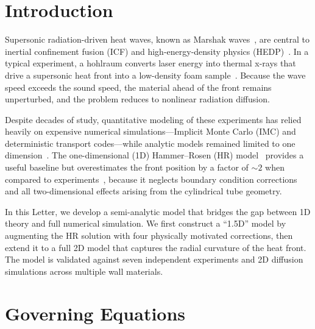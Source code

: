\documentclass[prl, twocolumn, superscriptaddress, amsmath, amssymb, reprint]{revtex4-2}
\begin{document}
\maketitle

\section{Introduction}

Supersonic radiation-driven heat waves, known as Marshak waves~\cite{Marshak1958, Zel'dovich1967}, are central to inertial confinement fusion (ICF) and high-energy-density physics (HEDP)~\cite{Lindl2004}.
In a typical experiment, a hohlraum converts laser energy into thermal x-rays that drive a supersonic heat front into a low-density foam sample~\cite{Back2000PRL, Back2000POP, Moore2015}.
Because the wave speed exceeds the sound speed, the material ahead of the front remains unperturbed, and the problem reduces to nonlinear radiation diffusion.

Despite decades of study, quantitative modeling of these experiments has relied heavily on expensive numerical simulations---Implicit Monte Carlo (IMC) and deterministic transport codes---while analytic models remained limited to one dimension~\cite{Hammer2003, Shussman2015, Henyey1955}.
The one-dimensional (1D) Hammer--Rosen (HR) model~\cite{Hammer2003} provides a useful baseline but overestimates the front position by a factor of $\sim 2$ when compared to experiments~\cite{Back2000POP}, because it neglects boundary condition corrections and all two-dimensional effects arising from the cylindrical tube geometry.

In this Letter, we develop a semi-analytic model that bridges the gap between 1D theory and full numerical simulation.
We first construct a ``1.5D'' model by augmenting the HR solution with four physically motivated corrections, then extend it to a full 2D model that captures the radial curvature of the heat front.
The model is validated against seven independent experiments and 2D diffusion simulations across multiple wall materials.

\section{Governing Equations}
\end{document}
